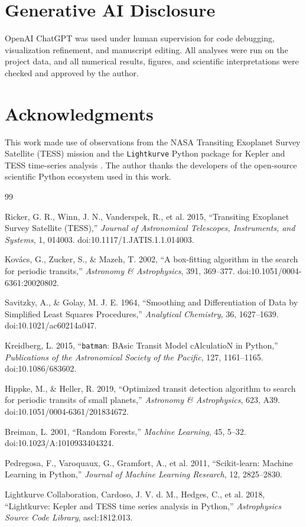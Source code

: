 \documentclass[10pt,twocolumn]{article}
\begin{document}
\section*{Generative AI Disclosure}

OpenAI ChatGPT was used under human supervision for code debugging, visualization refinement, and manuscript editing. All analyses were run on the project data, and all numerical results, figures, and scientific interpretations were checked and approved by the author.

\section*{Acknowledgments}

This work made use of observations from the NASA Transiting Exoplanet Survey Satellite (TESS) mission and the \texttt{Lightkurve} Python package for Kepler and TESS time-series analysis \cite{lightkurve2018}. The author thanks the developers of the open-source scientific Python ecosystem used in this work.

\begin{thebibliography}{99}

Ricker, G. R., Winn, J. N., Vanderspek, R., et al. 2015, ``Transiting Exoplanet Survey Satellite (TESS),'' \textit{Journal of Astronomical Telescopes, Instruments, and Systems}, 1, 014003. doi:10.1117/1.JATIS.1.1.014003.

Kov\'acs, G., Zucker, S., \& Mazeh, T. 2002, ``A box-fitting algorithm in the search for periodic transits,'' \textit{Astronomy \& Astrophysics}, 391, 369--377. doi:10.1051/0004-6361:20020802.

Savitzky, A., \& Golay, M. J. E. 1964, ``Smoothing and Differentiation of Data by Simplified Least Squares Procedures,'' \textit{Analytical Chemistry}, 36, 1627--1639. doi:10.1021/ac60214a047.

Kreidberg, L. 2015, ``\texttt{batman}: BAsic Transit Model cAlculatioN in Python,'' \textit{Publications of the Astronomical Society of the Pacific}, 127, 1161--1165. doi:10.1086/683602.

Hippke, M., \& Heller, R. 2019, ``Optimized transit detection algorithm to search for periodic transits of small planets,'' \textit{Astronomy \& Astrophysics}, 623, A39. doi:10.1051/0004-6361/201834672.

Breiman, L. 2001, ``Random Forests,'' \textit{Machine Learning}, 45, 5--32. doi:10.1023/A:1010933404324.

Pedregosa, F., Varoquaux, G., Gramfort, A., et al. 2011, ``Scikit-learn: Machine Learning in Python,'' \textit{Journal of Machine Learning Research}, 12, 2825--2830.

Lightkurve Collaboration, Cardoso, J. V. d. M., Hedges, C., et al. 2018, ``Lightkurve: Kepler and TESS time series analysis in Python,'' \textit{Astrophysics Source Code Library}, ascl:1812.013.

\end{thebibliography}
\end{document}
